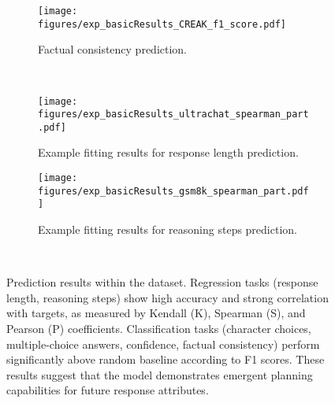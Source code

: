 \begin{figure*}[tb!]
    \begin{subfigure}[b]{0.32\linewidth}
        \centering
        \texttt{[image: figures/exp\_basicResults\_CREAK\_f1\_score.pdf]}
        \vspace{-15pt}
        \caption{Factual consistency prediction.}
        \label{fig:exp_factual_consistency_inDataset}
    \end{subfigure}
    \\
    \setcounter{mycounter}{7}
    \begin{subfigure}[b]{0.49\linewidth}
        \centering
        \vspace{2pt}
        \texttt{[image: figures/exp\_basicResults\_ultrachat\_spearman\_part.pdf]}
        \caption{Example fitting results for response length prediction.}
        \label{fig:exp_response_length_inDataset}
    \end{subfigure}
    \hfill  %
    \setcounter{mycounter}{8}
    \begin{subfigure}[b]{0.49\linewidth}
        \centering
        \vspace{2pt}
        \texttt{[image: figures/exp\_basicResults\_gsm8k\_spearman\_part.pdf]}
        \caption{Example fitting results for reasoning steps prediction.}
        \label{fig:exp_reasoning_steps_inDataset}
    \end{subfigure}
    \\
    \vspace{-8pt}
    \caption{\label{fig:exp_inDataset} Prediction results within the dataset. Regression tasks (response length, reasoning steps) show high accuracy and strong correlation with targets, as measured by Kendall (K), Spearman (S), and Pearson (P) coefficients. Classification tasks (character choices, multiple-choice answers, confidence, factual consistency) perform significantly above random baseline according to F1 scores. These results suggest that the model demonstrates emergent planning capabilities for future response attributes.}
    \vspace{-8pt}
\end{figure*}

